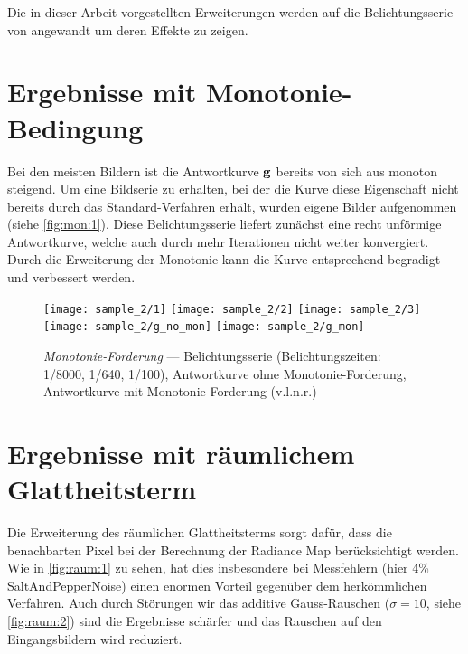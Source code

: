 Die in dieser Arbeit vorgestellten Erweiterungen werden auf die Belichtungsserie von \cite{tellone} angewandt um deren Effekte zu zeigen.




\section{Ergebnisse mit Monotonie-Bedingung}

Bei den meisten Bildern ist die Antwortkurve $\mathbf g$ bereits von sich aus monoton steigend. Um eine Bildserie zu erhalten, bei der die Kurve diese Eigenschaft nicht bereits durch das Standard-Verfahren erhält, wurden eigene Bilder aufgenommen (siehe \autoref{fig:mon:1}). Diese Belichtungsserie liefert zunächst eine recht unförmige Antwortkurve, welche auch durch mehr Iterationen nicht weiter konvergiert. Durch die Erweiterung der Monotonie kann die Kurve entsprechend begradigt und verbessert werden.

\begin{figure}
  \begin{center}
    \texttt{[image: sample\_2/1]}
    \texttt{[image: sample\_2/2]}
    \texttt{[image: sample\_2/3]}
     \hfill
    \texttt{[image: sample\_2/g\_no\_mon]}
    \texttt{[image: sample\_2/g\_mon]}
    \caption{\textit{Monotonie-Forderung} --- Belichtungsserie (Belichtungszeiten: 1/8000, 1/640, 1/100),  Antwortkurve ohne Monotonie-Forderung, Antwortkurve mit Monotonie-Forderung  (v.l.n.r.)}
    \label{fig:mon:1}
  \end{center}
\end{figure}



\section{Ergebnisse mit räumlichem Glattheitsterm}

Die Erweiterung des räumlichen Glattheitsterms sorgt dafür, dass die benachbarten Pixel bei der Berechnung der \gls{Radiance Map} berücksichtigt werden. Wie in \autoref{fig:raum:1} zu sehen, hat dies insbesondere bei Messfehlern (hier 4\% \gls{SaltAndPepperNoise}) einen enormen Vorteil gegenüber dem herkömmlichen Verfahren. Auch durch Störungen wir das additive Gauss-Rauschen ($\sigma=10$, siehe \autoref{fig:raum:2}) sind die Ergebnisse schärfer und das Rauschen auf den Eingangsbildern wird reduziert.


